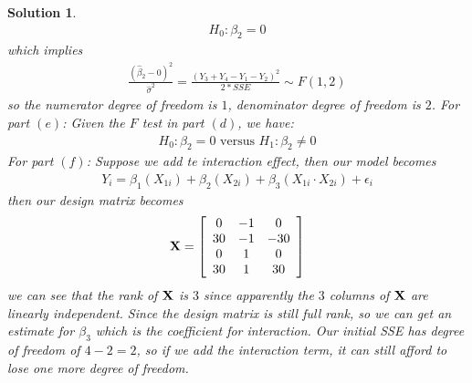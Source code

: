 \documentclass[11pt]{article}
\newtheorem{sol}{Solution}
\begin{document}
\begin{sol}
	\begin{align*}
		H_0: \beta_2 = 0
	\end{align*}
	which implies
	\begin{align*}
		\frac{(\hat{\beta}_2 - 0)^2}{\hat{\sigma}^2} = \frac{(Y_3 + Y_4 - Y_1 - Y_2)^2}{2\ast SSE} \sim F(1, 2)
	\end{align*}
	so the numerator degree of freedom is $1$, denominator degree of freedom is $2$.\vskip 2mm
	For part $(e)$:\vskip 2mm
	Given the $F$ test in part $(d)$, we have:
	\begin{align*}
		H_0: \beta_2 = 0 \text{ versus } H_1: \beta_2 \neq 0
	\end{align*}
	For part $(f)$:\vskip 2mm
	Suppose we add te interaction effect, then our model becomes
	\begin{align*}
		Y_i = \beta_1(X_{1i}) + \beta_2(X_{2i}) + \beta_3(X_{1i}\cdot X_{2i}) + \epsilon_i
	\end{align*}
	then our design matrix becomes
	\begin{align*}
		{\bf X} = \left[\begin{array}{ccc} 0&-1&0\\ 30&-1&-30\\ 0&1&0\\ 30&1 & 30\end{array}\right]
	\end{align*}
	we can see that the rank of ${\bf X}$ is $3$ since apparently the $3$ columns of ${\bf X}$ are linearly independent. Since the design matrix is still full rank, so we can get an estimate for $\beta_3$ which is the coefficient for interaction.\vskip 2mm
	Our initial SSE has degree of freedom of $4 - 2 = 2$, so if we add the interaction term, it can still afford to lose one more degree of freedom.
\end{sol}
\end{document}
